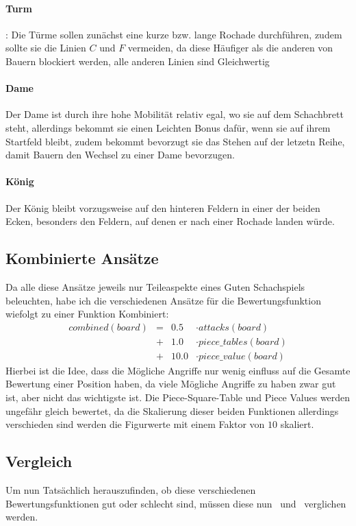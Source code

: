 \documentclass[12pt, a4paper, oneside, openright]{article}
\newcommand \bzw{bzw.\xspace }
\begin{document}
\paragraph{Turm}:
Die Türme sollen zunächst eine kurze \bzw lange Rochade durchführen, zudem sollte sie die Linien $ C $ und $ F $ vermeiden, da diese Häufiger als die anderen von Bauern blockiert werden, alle anderen Linien sind Gleichwertig
\paragraph{Dame}
Der Dame ist durch ihre hohe Mobilität relativ egal, wo sie auf dem Schachbrett steht, allerdings bekommt sie einen Leichten Bonus dafür, wenn sie auf ihrem Startfeld bleibt, zudem bekommt bevorzugt sie das Stehen auf der letzetn Reihe, damit Bauern den Wechsel zu einer Dame bevorzugen.
\paragraph{König}
Der König bleibt vorzugsweise auf den hinteren Feldern in einer der beiden Ecken, besonders den Feldern, auf denen er nach einer Rochade landen würde.
\subsection{Kombinierte Ansätze}\label{subsec:kombinierte-versuche}
Da alle diese Ansätze jeweils nur Teileaspekte eines Guten Schachspiels beleuchten, habe ich die verschiedenen Ansätze für die Bewertungsfunktion wiefolgt zu einer Funktion Kombiniert:
\[
\begin{aligned}
    combined(board) & = & 0.5 & \cdot attacks(board) \\
    & + & 1.0 & \cdot piece\_tables(board) \\
    & + & 10.0 & \cdot piece\_value(board)
\end{aligned}
\]
Hierbei ist die Idee, dass die Mögliche Angriffe nur wenig einfluss auf die Gesamte Bewertung einer Position haben, da viele Mögliche Angriffe zu haben zwar gut ist, aber nicht das wichtigste ist.
Die Piece-Square-Table und Piece Values werden ungefähr gleich bewertet, da die Skalierung dieser beiden Funktionen allerdings verschieden sind werden die Figurwerte mit einem Faktor von $ 10 $ skaliert.

\subsection{Vergleich}\label{subsec:vergleich}
Um nun Tatsächlich herauszufinden, ob diese verschiedenen Bewertungsfunktionen gut oder schlecht sind, müssen diese nun~ und~ verglichen werden.
\end{document}

